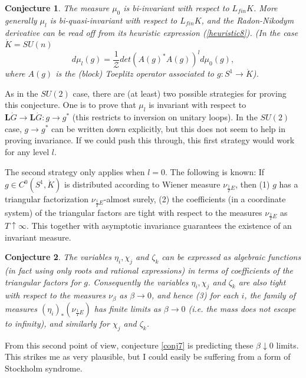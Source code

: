 \documentclass{amsart}
\theoremstyle{conjecture}
\newtheorem{conjecture}{Conjecture}
\theoremstyle{definition}
\theoremstyle{question}
\theoremstyle{questions}
\theoremstyle{remark}
\theoremstyle{remarks}
\theoremstyle{example}
\numberwithin{equation}{section}
\begin{document}
\begin{conjecture}\label{conj8} The measure $\mu_0$ is bi-invariant
with respect to $L_{fin}K$. More generally $\mu_l$
is bi-quasi-invariant with respect to $L_{fin}K$, and
the Radon-Nikodym derivative can be read off from its heuristic
expression (\ref{heuristic8}). (In the case $\dot K=SU(n)$
\begin{equation}\label{heuristic9}d\mu_l(g)=\frac 1{\mathcal Z}det(A(g)^*A(g))^{l}d\mu_0
(g),\end{equation} where $A(g)$ is the (block) Toeplitz operator
associated to $g:S^1 \to \dot K$).

\end{conjecture}




As in the $SU(2)$ case, there are (at least) two possible strategies for proving this conjecture.
One is to prove that $\mu_l$ is invariant with respect to $\mathbf L\dot G \to \mathbf L \dot G:g\to g^*$ (this restricts to inversion on unitary loops). In the $SU(2)$ case, $g\to g^*$ can be written down explicitly, but this
does not seem to help in proving invariance. If we could push this through, this first strategy would work for any level $l$.

The second strategy only applies when $l=0$. The following is known: If $g\in C^0(S^1,\dot K)$ is distributed according to
Wiener measure $\nu_{\frac 1T E}$, then (1)  $g$ has a triangular factorization $\nu_{\frac 1T E}$-almost surely, (2) the coefficients (in a coordinate system) of the triangular factors are tight with respect to the measures $\nu_{\frac 1T E}$ as $T\uparrow \infty$. This together with asymptotic invariance guarantees the existence of an invariant measure.

\begin{conjecture} The variables $\eta_i,\chi_j$ and $\zeta_k$ can be expressed as algebraic functions (in fact
using only roots and rational expressions) in terms of coefficients of the triangular factors for $g$.
Consequently the variables $\eta_i,\chi_j$ and $\zeta_k$ are also tight with respect to the measures $\nu_{\beta}$ as $\beta\to 0$, and hence (3) for each $i$, the family of measures $(\eta_i)_*(\nu_{\frac 1T E})$ has finite limits as $\beta\to 0$ (i.e. the mass does not escape to infinity), and similarly for $\chi_j$ and $\zeta_k$.
\end{conjecture}

From this second point of view, conjecture \ref{conj7} is predicting these $\beta\downarrow 0$ limits. This strikes me as very plausible, but I could easily be suffering from a form of Stockholm syndrome.
\end{document}
